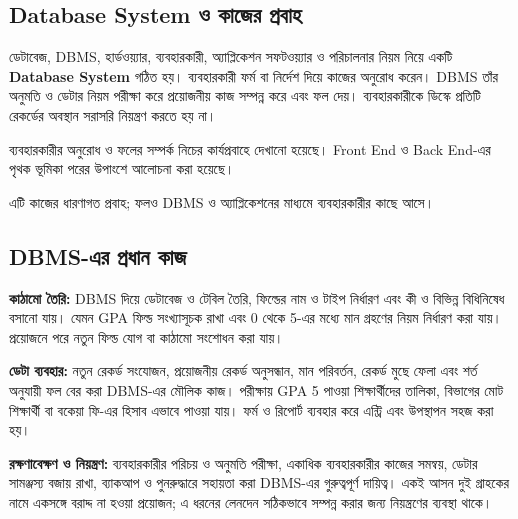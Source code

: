 \subsection{Database System ও কাজের প্রবাহ}
ডেটাবেজ, DBMS, হার্ডওয়্যার, ব্যবহারকারী, অ্যাপ্লিকেশন সফটওয়্যার ও পরিচালনার নিয়ম নিয়ে একটি \textbf{Database System} গঠিত হয়। ব্যবহারকারী ফর্ম বা নির্দেশ দিয়ে কাজের অনুরোধ করেন। DBMS তাঁর অনুমতি ও ডেটার নিয়ম পরীক্ষা করে প্রয়োজনীয় কাজ সম্পন্ন করে এবং ফল দেয়। ব্যবহারকারীকে ডিস্কে প্রতিটি রেকর্ডের অবস্থান সরাসরি নিয়ন্ত্রণ করতে হয় না।

ব্যবহারকারীর অনুরোধ ও ফলের সম্পর্ক নিচের কার্যপ্রবাহে দেখানো হয়েছে। Front End ও Back End-এর পৃথক ভূমিকা পরের উপাংশে আলোচনা করা হয়েছে।


\begin{flushleft}
\end{flushleft}
এটি কাজের ধারণাগত প্রবাহ; ফলও DBMS ও অ্যাপ্লিকেশনের মাধ্যমে ব্যবহারকারীর কাছে আসে।
\subsection{DBMS-এর প্রধান কাজ}
\textbf{কাঠামো তৈরি:} DBMS দিয়ে ডেটাবেজ ও টেবিল তৈরি, ফিল্ডের নাম ও টাইপ নির্ধারণ এবং কী ও বিভিন্ন বিধিনিষেধ বসানো যায়। যেমন GPA ফিল্ড সংখ্যাসূচক রাখা এবং 0 থেকে 5-এর মধ্যে মান গ্রহণের নিয়ম নির্ধারণ করা যায়। প্রয়োজনে পরে নতুন ফিল্ড যোগ বা কাঠামো সংশোধন করা যায়।

\textbf{ডেটা ব্যবহার:} নতুন রেকর্ড সংযোজন, প্রয়োজনীয় রেকর্ড অনুসন্ধান, মান পরিবর্তন, রেকর্ড মুছে ফেলা এবং শর্ত অনুযায়ী ফল বের করা DBMS-এর মৌলিক কাজ। পরীক্ষায় GPA 5 পাওয়া শিক্ষার্থীদের তালিকা, বিভাগের মোট শিক্ষার্থী বা বকেয়া ফি-এর হিসাব এভাবে পাওয়া যায়। ফর্ম ও রিপোর্ট ব্যবহার করে এন্ট্রি এবং উপস্থাপন সহজ করা হয়।

\textbf{রক্ষণাবেক্ষণ ও নিয়ন্ত্রণ:} ব্যবহারকারীর পরিচয় ও অনুমতি পরীক্ষা, একাধিক ব্যবহারকারীর কাজের সমন্বয়, ডেটার সামঞ্জস্য বজায় রাখা, ব্যাকআপ ও পুনরুদ্ধারে সহায়তা করা DBMS-এর গুরুত্বপূর্ণ দায়িত্ব। একই আসন দুই গ্রাহকের নামে একসঙ্গে বরাদ্দ না হওয়া প্রয়োজন; এ ধরনের লেনদেন সঠিকভাবে সম্পন্ন করার জন্য নিয়ন্ত্রণের ব্যবস্থা থাকে।


